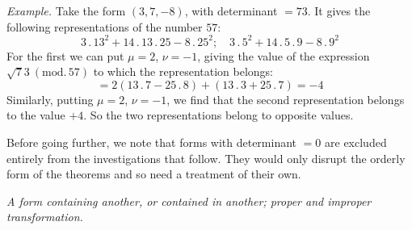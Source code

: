 \textit{Example.} Take the form $(3,7,-8)$, with determinant $=73$. It gives the following representations of the number $57$:
\[
3\mathbin{.}13^2+14\mathbin{.}13\mathbin{.}25-8\mathbin{.}25^2;\quad
3\mathbin{.}5^2+14\mathbin{.}5\mathbin{.}9-8\mathbin{.}9^2
\]
For the first we can put $\mu=2$, $\nu=-1$, giving the value of the expression $\surd73\ (\mathrm{mod.}\,57)$ to which the representation belongs:
\[
{}=2(13\mathbin{.}7-25\mathbin{.}8)+(13\mathbin{.}3+25\mathbin{.}7)=-4
\]
Similarly, putting $\mu=2$, $\nu=-1$, we find that the second representation belongs to the value $+4$. So the two representations belong to opposite values.

Before going further, we note that forms with determinant $=0$ are excluded entirely from the investigations that follow. They would only disrupt the orderly form of the theorems and so need a treatment of their own.

\begin{center}
\textit{A form containing another, or contained in another; proper and improper transformation.}
\end{center}

